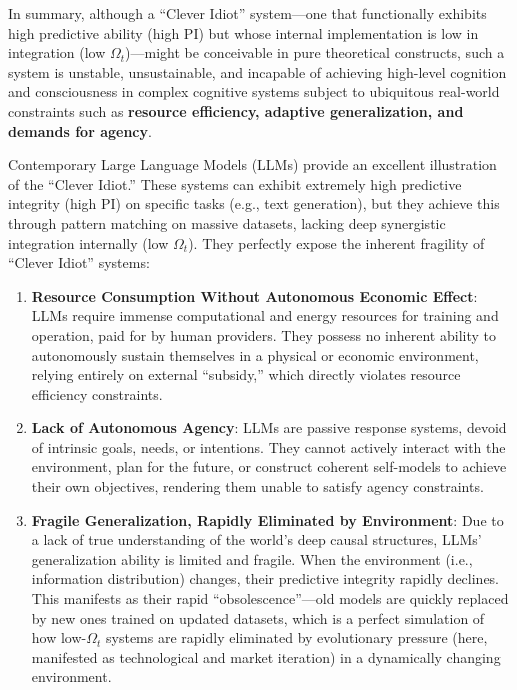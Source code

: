 \documentclass[
  a4paper]{article}
\providecommand{\tightlist}{%
  \setlength{\itemsep}{0pt}\setlength{\parskip}{0pt}}
\begin{document}
In summary, although a ``Clever Idiot'' system---one that functionally
exhibits high predictive ability (high PI) but whose internal
implementation is low in integration (low \(\Omega_t\))---might be
conceivable in pure theoretical constructs, such a system is unstable,
unsustainable, and incapable of achieving high-level cognition and
consciousness in complex cognitive systems subject to ubiquitous
real-world constraints such as \textbf{resource efficiency, adaptive
generalization, and demands for agency}.

Contemporary Large Language Models (LLMs) provide an excellent
illustration of the ``Clever Idiot.'' These systems can exhibit
extremely high predictive integrity (high PI) on specific tasks (e.g.,
text generation), but they achieve this through pattern matching on
massive datasets, lacking deep synergistic integration internally (low
\(\Omega_t\)). They perfectly expose the inherent fragility of ``Clever
Idiot'' systems:

\begin{enumerate}
\def\labelenumi{\arabic{enumi}.}
\tightlist
\item
  \textbf{Resource Consumption Without Autonomous Economic Effect}: LLMs
  require immense computational and energy resources for training and
  operation, paid for by human providers. They possess no inherent
  ability to autonomously sustain themselves in a physical or economic
  environment, relying entirely on external ``subsidy,'' which directly
  violates resource efficiency constraints.
\item
  \textbf{Lack of Autonomous Agency}: LLMs are passive response systems,
  devoid of intrinsic goals, needs, or intentions. They cannot actively
  interact with the environment, plan for the future, or construct
  coherent self-models to achieve their own objectives, rendering them
  unable to satisfy agency constraints.
\item
  \textbf{Fragile Generalization, Rapidly Eliminated by Environment}:
  Due to a lack of true understanding of the world's deep causal
  structures, LLMs' generalization ability is limited and fragile. When
  the environment (i.e., information distribution) changes, their
  predictive integrity rapidly declines. This manifests as their rapid
  ``obsolescence''---old models are quickly replaced by new ones trained
  on updated datasets, which is a perfect simulation of how
  low-\(\Omega_t\) systems are rapidly eliminated by evolutionary
  pressure (here, manifested as technological and market iteration) in a
  dynamically changing environment.
\end{enumerate}
\end{document}
